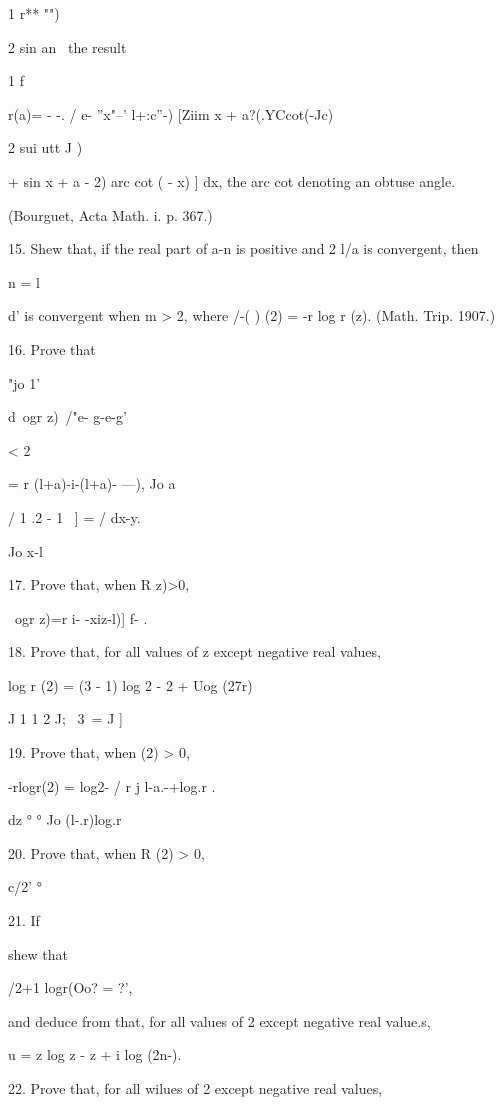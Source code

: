 1 r** "")

2 sin an \ the result

1 f

r(a)= - -. / e- ''x"--' l+:c''-) [Ziim x + a?(.YCcot(-Jc)

2 sui utt J )

+ sin x + a - 2) arc cot ( - x) ] dx, the arc cot denoting an obtuse
angle.

(Bourguet, Acta Math. i. p. 367.)

15. Shew that, if the real part of a-n is positive and 2 l/a is
convergent, then

n = l

d' is convergent when m > 2, where \//-( ) (2) = -r log r (z). (Math.
Trip. 1907.)

16. Prove that

"jo 1'

d\ ogr z)\ /"e- g-e-g'

< 2

= r (l+a)-i-(l+a)- ---), Jo a

/ 1 .2 - 1 \ ] = / dx-y. 

Jo x-l

%
%

17. Prove that, when R z)>0,

\ ogr z)=r i- -xiz-l)] f- . 

18. Prove that, for all values of z except negative real values,

log r (2) = (3 - 1) log 2 - 2 + Uog (27r)

J 1 1 2 J; \ 3\ = J ]

19. Prove that, when (2) > 0,

-rlogr(2) = log2- / r j l-a.-+log.r .

dz ° ° Jo (l-.r)log.r

20. Prove that, when R (2) > 0,

c/2' °

21. If

shew that

/2+1 logr(Oo? = ?',

and deduce from  that, for all values of 2 except negative real
value.s,

u = z log z - z + i log (2n-).


22. Prove that, for all wilues of 2 except negative real values,

